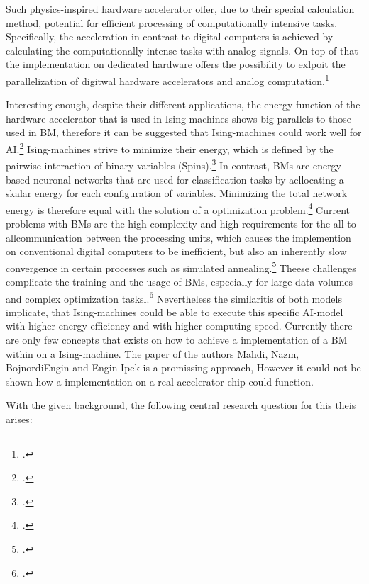 Such physics-inspired hardware accelerator offer, due to their special calculation method,
potential for efficient processing of computationally intensive tasks. 
Specifically, the acceleration in contrast to digital computers is achieved by calculating
the computationally intense tasks with analog signals.
On top of that the implementation on dedicated hardware offers the possibility to exlpoit the parallelization
of digitwal hardware accelerators and analog computation.\footcite[Vgl.][4]{mohseniIsingMachinesHardware2022}

Interesting enough, despite their different applications, the energy function of the hardware accelerator that is used
in Ising-machines shows big parallels to those used in \ac{BM}, therefore it can be suggested that Ising-machines could work well for AI.\footcite[Vgl.][10]{caiHarnessingIntrinsicNoise2019}
Ising-machines strive to minimize their energy, which is defined by the pairwise 
interaction of binary variables (Spins).\footcite[Vgl.][1]{wangOscillatorbasedIsingMachine2017} 
In contrast, \ac{BM}s are energy-based neuronal networks that are used for classification tasks by 
acllocating a skalar energy for each configuration of variables.
Minimizing the total network energy is therefore equal with the solution of a optimization problem.\footcite[Vgl.][2]{nazmbojnordiMemristiveBoltzmannMachine2016} 
Current problems with \ac{BM}s are the high complexity and high requirements for the all-to-allcommunication between the processing units,
which causes the implemention on conventional digital computers to be inefficient, but also 
an inherently slow convergence in certain processes such as simulated annealing.\footcite[Vgl.][1]{nazmbojnordiMemristiveBoltzmannMachine2016} 
Theese challenges complicate the training and the usage of \ac{BM}s, especially for large data volumes and complex optimization tasksl.\footcite[Vgl.][2]{nazmbojnordiMemristiveBoltzmannMachine2016} 
Nevertheless the similaritis of both models implicate, that Ising-machines could be able to execute this 
specific AI-model with higher energy efficiency and with higher computing speed.
Currently there are only few concepts that exists on how to achieve a implementation of a \ac{BM} within on a Ising-machine.
The paper of the authors Mahdi, Nazm, BojnordiEngin and Engin Ipek is a promissing approach,
However it could not be shown how a implementation on a real accelerator chip could function.

With the given background, the following central research question for this theis arises:


